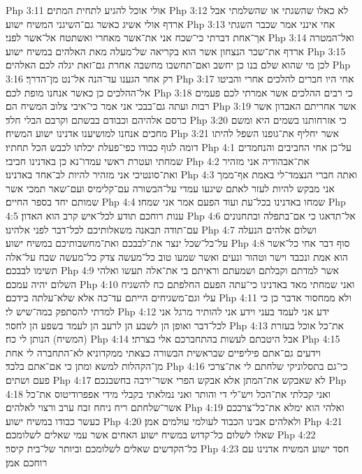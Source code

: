 Php 3:11  אולי אוכל להגיע לתחית המתים׃
Php 3:12  לא כאלו שהשגתי או שהשלמתי אבל ארדף אולי אשיג כאשר גם־השיגני המשיח ישוע׃
Php 3:13  אחי אינני אמר שכבר השגתי אך־אחת דברתי כי־שכח אני את־אשר מאחרי ואשתטח אל־אשר לפני׃
Php 3:14  ואל־המטרה ארדף את־שכר הנצחון אשר הוא בקריאה של־מעלה מאת האלהים במשיח ישוע׃
Php 3:15  לכן מי שהוא שלם בנו כן יחשב ואם־תחשבו מחשבה אחרת גם־זאת יגלה לכם האלהים׃
Php 3:16  רק אחר הגענו עד־הנה אל־נט מן־הדרך׃
Php 3:17  אחי היו חברים להלכים אחרי והביטו אל־ההלכים כן כאשר אנחנו מופת לכם׃
Php 3:18  כי רבים ההלכים אשר אמרתי לכם פעמים רבות ועתה גם־בבכי אני אמר כי־איבי צלוב המשיח הם׃
Php 3:19  אשר אחריתם האבדון אשר כרסם אלהיהם וכבודם בבשתם וקרבם הבלי חלד׃
Php 3:20  כי אזרחותנו בשמים היא ומשם מחכים אנחנו למושיענו אדנינו ישוע המשיח׃
Php 3:21  אשר יחליף את־גופנו השפל להיתו דומה לגוף כבודו כפי־פעלת יכלתו לכבש הכל תחתיו׃
Php 4:1  על־כן אחי החביבים והנחמדים שמחתי ועטרת ראשי עמדו־נא כן באדנינו חביבי׃
Php 4:2  את־אבהודיה אני מזהיר ואת־סונטיכי אני מזהיר להיות לב־אחד באדנינו׃
Php 4:3  ואתה חברי הנצמד־לי באמת אף־ממך אני מבקש להיות לעזר לאתם שיגעו עמדי על־הבשורה עם־קלימיס ועם־שאר תמכי אשר שמותם יחד בספר החיים׃
Php 4:4  שמחו באדנינו בכל־עת ועוד הפעם אמר אני שמחו׃
Php 4:5  ענות רוחכם תודע לכל־איש קרב הוא האדון׃
Php 4:6  אל־תדאגו כי אם־בתפלה ובתחנונים עם־תודה תבאנה משאלותיכם לכל־דבר לפני אלהינו׃
Php 4:7  ושלום אלהים הנעלה על־כל־שכל ינצר את־לבבכם ואת־מחשבותיכם במשיח ישוע׃
Php 4:8  סוף דבר אחי כל־אשר הוא אמת ונכבד וישר וטהור ונעים ואשר שמעו טוב כל־מעשה צדק כל־מעשה שבח על־אלה תשימו לבבכם׃
Php 4:9  אשר למדתם וקבלתם ושמעתם וראיתם בי את־אלה תעשו ואלהי השלום יהיה עמכם׃
Php 4:10  ואני שמחתי מאד באדנינו כי־עתה הפעם החלפתם כח להשגיח עלי וגם־משגיחים הייתם עד־כה אלא שלא־עלתה בידכם׃
Php 4:11  ולא ממחסור אדבר כן כי למדתי להסתפק במה־שיש לי׃
Php 4:12  ידע אני לעמד בעני וידע אני להותיר מרגל אני לכל־דבר ואופן הן לשבע הן לרעב הן לעמד בשפע הן לחסר׃
Php 4:13  את־כל אוכל בעזרת (המשיח) הנותן לי כח׃
Php 4:14  אבל היטבתם לעשות בהתחברכם אלי בצרתי׃
Php 4:15  וידעים גם־אתם פיליפיים שבראשית הבשורה כצאתי ממקדוניא לא־התחברה לי אחת מן־הקהלות למשא ומתן כי אם־אתם בלבד׃
Php 4:16  כי־גם בתסלוניקי שלחתם לי את־צרכי פעם ושתים׃
Php 4:17  לא שאבקש את־המתן אלא אבקש הפרי אשר־ירבה בחשבנכם׃
Php 4:18  ואני קבלתי את־הכל ויש־לי די והותר ואני נמלאתי בקבלי מידי אפפרודיטוס את־כל אשר־שלחתם ריח ניחח זבח ערב ורצוי לאלהים׃
Php 4:19  ואלהי הוא ימלא את־כל־צרככם כעשר כבודו במשיח ישוע׃
Php 4:20  ולאלהים אבינו הכבוד לעולמי עולמים אמן׃
Php 4:21  שאלו לשלום כל־קדוש במשיח ישוע האחים אשר עמי שאלים לשלומכם׃
Php 4:22  כל־הקדשים שאלים לשלומכם וביותר של־בית קיסר׃
Php 4:23  חסד ישוע המשיח אדנינו עם רוחכם אמן׃


